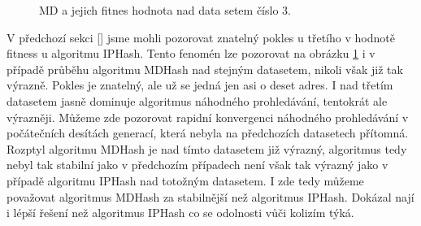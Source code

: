 \begin{figure}[!ht]
	\centering
	\caption{MD a jejich fitnes hodnota nad data setem číslo 3.}
	\label{fig:MDComparison3}
\end{figure}

V předchozí sekci [] jsme mohli pozorovat znatelný pokles u třetího v hodnotě fitness u algoritmu IPHash. Tento fenomén lze
pozorovat na obrázku \ref{fig:MDComparison3} i v případě průběhu algoritmu MDHash nad stejným datasetem, nikoli však již
tak výrazně. Pokles je znatelný, ale už se jedná jen asi o deset adres. I nad třetím datasetem jasně dominuje algoritmus náhodného
prohledávání, tentokrát ale výrazněji. Můžeme zde pozorovat rapidní konvergenci náhodného prohledávání v počátečních desítách
generací, která nebyla na předchozích datasetech přítomná. Rozptyl algoritmu MDHash je nad tímto datasetem již výrazný, algoritmus
tedy nebyl tak stabilní jako v předchozím případech není však tak výrazný jako v případě algoritmu IPHash nad totožným datasetem.
I zde tedy můžeme považovat algoritmus MDHash za stabilnější než algoritmus IPHash. Dokázal nají i lépší řešení než algoritmus
IPHash co se odolnosti vůči kolizím týká.

